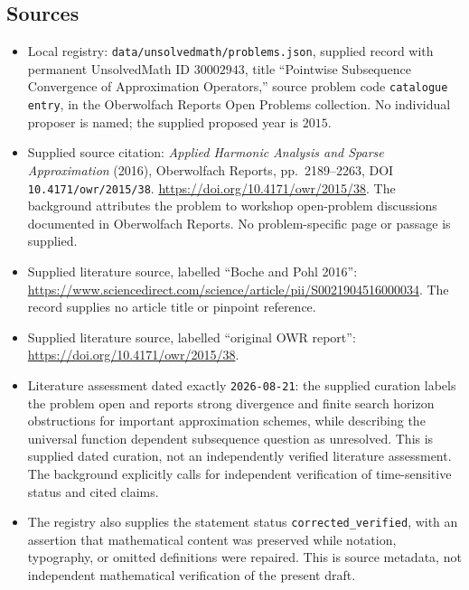 \documentclass[11pt]{article}
\begin{document}
\subsection{Sources}
\begin{itemize}
\item Local registry: \texttt{data/unsolvedmath/problems.json}, supplied record with permanent UnsolvedMath ID \(30002943\), title ``Pointwise Subsequence Convergence of Approximation Operators,'' source problem code \texttt{catalogue entry}, in the Oberwolfach Reports Open Problems collection. No individual proposer is named; the supplied proposed year is \(2015\).
\item Supplied source citation: \emph{Applied Harmonic Analysis and Sparse Approximation} (2016), Oberwolfach Reports, pp.~2189--2263, DOI \texttt{10.4171/owr/2015/38}. \url{https://doi.org/10.4171/owr/2015/38}. The background attributes the problem to workshop open-problem discussions documented in Oberwolfach Reports. No problem-specific page or passage is supplied.
\item Supplied literature source, labelled ``Boche and Pohl 2016'': \url{https://www.sciencedirect.com/science/article/pii/S0021904516000034}. The record supplies no article title or pinpoint reference.
\item Supplied literature source, labelled ``original OWR report'': \url{https://doi.org/10.4171/owr/2015/38}.
\item Literature assessment dated exactly \texttt{2026-08-21}: the supplied curation labels the problem open and reports strong divergence and finite search horizon obstructions for important approximation schemes, while describing the universal function dependent subsequence question as unresolved. This is supplied dated curation, not an independently verified literature assessment. The background explicitly calls for independent verification of time-sensitive status and cited claims.
\item The registry also supplies the statement status \texttt{corrected\_verified}, with an assertion that mathematical content was preserved while notation, typography, or omitted definitions were repaired. This is source metadata, not independent mathematical verification of the present draft.
\end{itemize}
\end{document}
